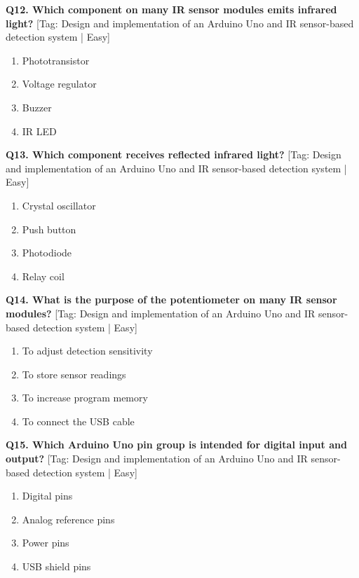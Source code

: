 \noindent\textbf{Q12. Which component on many IR sensor modules emits infrared light?} \hfill [Tag: Design and implementation of an Arduino Uno and IR sensor-based detection system | Easy]
\begin{enumerate}[label=(\alph*),topsep=2pt,itemsep=1pt,partopsep=0pt,parsep=0pt]
    \item {Phototransistor}
    \item {Voltage regulator}
    \item {Buzzer}
    \item {IR LED}
\end{enumerate}
\vspace{2mm}

\noindent\textbf{Q13. Which component receives reflected infrared light?} \hfill [Tag: Design and implementation of an Arduino Uno and IR sensor-based detection system | Easy]
\begin{enumerate}[label=(\alph*),topsep=2pt,itemsep=1pt,partopsep=0pt,parsep=0pt]
    \item {Crystal oscillator}
    \item {Push button}
    \item {Photodiode}
    \item {Relay coil}
\end{enumerate}
\vspace{2mm}

\noindent\textbf{Q14. What is the purpose of the potentiometer on many IR sensor modules?} \hfill [Tag: Design and implementation of an Arduino Uno and IR sensor-based detection system | Easy]
\begin{enumerate}[label=(\alph*),topsep=2pt,itemsep=1pt,partopsep=0pt,parsep=0pt]
    \item {To adjust detection sensitivity}
    \item {To store sensor readings}
    \item {To increase program memory}
    \item {To connect the USB cable}
\end{enumerate}
\vspace{2mm}

\noindent\textbf{Q15. Which Arduino Uno pin group is intended for digital input and output?} \hfill [Tag: Design and implementation of an Arduino Uno and IR sensor-based detection system | Easy]
\begin{enumerate}[label=(\alph*),topsep=2pt,itemsep=1pt,partopsep=0pt,parsep=0pt]
    \item {Digital pins}
    \item {Analog reference pins}
    \item {Power pins}
    \item {USB shield pins}
\end{enumerate}
\vspace{2mm}

